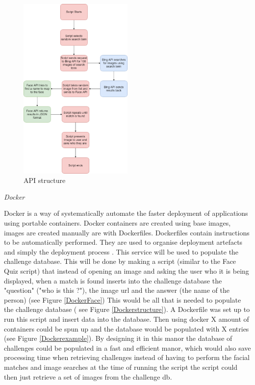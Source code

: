 \documentclass[12pt,a4paper]{article}
\begin{document}
\begin{figure}[!ht]
    \centering
    \includegraphics[width=0.50\textwidth]{Figs/API_structure.png} 
    \caption{API structure} 
    \label{APIstructure}
\end{figure}   

\emph{Docker} 
 
Docker is a way of systematically automate the faster deployment of applications using portable containers. Docker containers are created using base images, images are created manually are with Dockerfiles. Dockerfiles contain instructions to be automatically performed. They are used to organise deployment artefacts and simply the deployment process \cite{bernstein2014containers}. This service will be used to populate the challenge database. This will be done by making a script (similar to the Face Quiz script) that instead of opening an image and asking the user who it is being displayed, when a match is found inserts into the challenge database the "question" ("who is this ?"), the image url and the answer (the name of the person) (see Figure \ref{DockerFace}) This would be all that is needed to populate the challenge database ( see Figure \ref{Dockerstructure}). A Dockerfile was set up to run this script and insert data into the database. Then using docker X amount of containers could be spun up and the database would be populated with X entries (see Figure \ref{Dockerexample}). By designing it in this manor the database of challenges could be populated in a fast and efficient manor, which would also save processing time when retrieving challenges instead of having to perform the facial matches and image searches at the time of running the script the script could then just retrieve a set of images from the challenge db.
 
\end{document}
